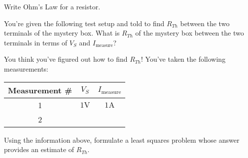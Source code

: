 

\begin{enumerate}

\qitem\label{ohmsLaw}{
	Write Ohm's Law for a resistor.}


\qitem\label{singlePoint}{
	You're given the following test setup and told to find $R_{Th}$ between the two terminals of the mystery box. What is $R_{Th}$ of the mystery box between the two terminals in terms of $V_S$ and $I_\text{measure}$?
	\begin{center}
		
	\end{center}}


\qitem\label{twoNoisyMeasurements}{
	You think you've figured out how to find $R_{Th}$! You've taken the following measurements:
	\begin{center}
		\begin{tabular}{|c|c|c|}
			\hline
			Measurement \# & $V_S$ & $I_\text{measure}$\\\hline
			1 & $1\si{\volt}$ & $1\si{\ampere}$\\\hline
			2 & 
		\end{tabular}
	\end{center}
	Using the information above, formulate a least squares problem whose answer provides an estimate of $R_{Th}$.
	}

\end{enumerate}